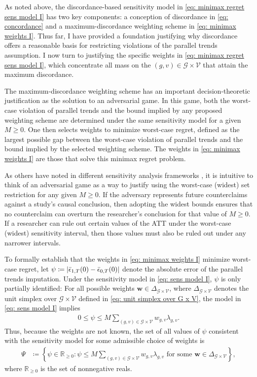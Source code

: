 \documentclass[twoside,11pt]{article}
\begin{document}
As noted above, the discordance-based sensitivity model in \eqref{eq: minimax regret sens model I} has two key components: a conception of discordance in \eqref{eq: concordance} and a maximum-discordance weighting scheme in \eqref{eq: minimax weights I}. Thus far, I have provided a foundation justifying why discordance offers a reasonable basis for restricting violations of the parallel trends assumption. I now turn to justifying the specific weights in \eqref{eq: minimax regret sens model I}, which concentrate all mass on the $(g,v) \in \mathcal{G} \times \mathcal{V}$ that attain the maximum discordance.

The maximum-discordance weighting scheme has an important decision-theoretic justification as the solution to an adversarial game. In this game, both the worst-case violation of parallel trends and the bound implied by any proposed weighting scheme are determined under the same sensitivity model for a given $M \geq 0$. One then selects weights to minimize worst-case regret, defined as the largest possible gap between the worst-case violation of parallel trends and the bound implied by the selected weighting scheme. The weights in \eqref{eq: minimax weights I} are those that solve this minimax regret problem.

As others have noted in different sensitivity analysis frameworks \citep[e.g.,][]{cohenetal2020}, it is intuitive to think of an adversarial game as a way to justify using the worst-case (widest) set restriction for any given $M \geq 0$. If the adversary represents future counterclaims against a study's causal conclusion, then adopting the widest bounds ensures that no counterclaim can overturn the researcher's conclusion for that value of $M \geq 0$. If a researcher can rule out certain values of the \textrm{ATT} under the worst-case (widest) sensitivity interval, then those values must also be ruled out under any narrower intervals.

To formally establish that the weights in \eqref{eq: minimax weights I} minimize worst-case regret, let $\psi \coloneqq \lvert\bar{\epsilon}_{1,T}(0) - \bar{\epsilon}_{0,T}(0)\rvert$ denote the absolute error of the parallel trends imputation. Under the sensitivity model in \eqref{eq: sens model I}, $\psi$ is only partially identified: For all possible weights $\bm{w} \in \Delta_{\mathcal{G}\times\mathcal{V}}$, where $\Delta_{\mathcal{G}\times\mathcal{V}}$ denotes the unit simplex over $\mathcal{G} \times \mathcal{V}$ defined in \eqref{eq: unit simplex over G x V}, the model in \eqref{eq: sens model I} implies
\begin{align*}
0 \leq \psi \leq M \sum_{(g,v) \in \mathcal{G} \times \mathcal{V}} w_{g,v}\lambda_{g,v}.
\end{align*}
Thus, because the weights are not known, the set of all values of $\psi$ consistent with the sensitivity model for some admissible choice of weights is
\begin{align} \label{eq: Psi}
\Psi & \coloneqq \left\{\psi \in \mathbb{R}_{\geq 0}: \psi \leq M \sum_{(g,v) \in \mathcal{G} \times \mathcal{V}} w_{g,v} \lambda_{g,v} \text{ for some } \bm{w} \in \Delta_{\mathcal{G}\times\mathcal{V}} \right\},
\end{align}
where $\mathbb{R}_{\geq 0}$ is the set of nonnegative reals.
\end{document}
